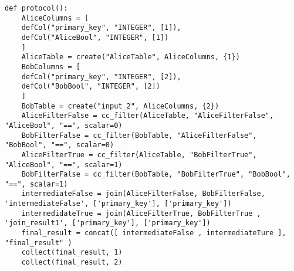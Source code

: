 \begin{lstlisting}[caption={Simpifiyed Protocol for our second use case in Conclave}]
def protocol():
	AliceColumns = [
	defCol("primary_key", "INTEGER", [1]),
	defCol("AliceBool", "INTEGER", [1])
	]
	AliceTable = create("AliceTable", AliceColumns, {1})
	BobColumns = [
	defCol("primary_key", "INTEGER", [2]),
	defCol("BobBool", "INTEGER", [2])
	]
	BobTable = create("input_2", AliceColumns, {2})
	AliceFilterFalse = cc_filter(AliceTable, "AliceFilterFalse", "AliceBool", "==", scalar=0)
	BobFilterFalse = cc_filter(BobTable, "AliceFilterFalse", "BobBool", "==", scalar=0)
	AliceFilterTrue = cc_filter(AliceTable, "BobFilterTrue", "AliceBool", "==", scalar=1)
	BobFilterFalse = cc_filter(BobTable, "BobFilterTrue", "BobBool", "==", scalar=1)
	intermediateFalse = join(AliceFilterFalse, BobFilterFalse, 'intermediateFalse', ['primary_key'], ['primary_key'])
	intermedidateTrue = join(AliceFilterTrue, BobFilterTrue , 'join_result1', ['primary_key'], ['primary_key'])
	final_result = concat([ intermediateFalse , intermediateTure ], "final_result" )
	collect(final_result, 1)
	collect(final_result, 2)
\end{lstlisting}



